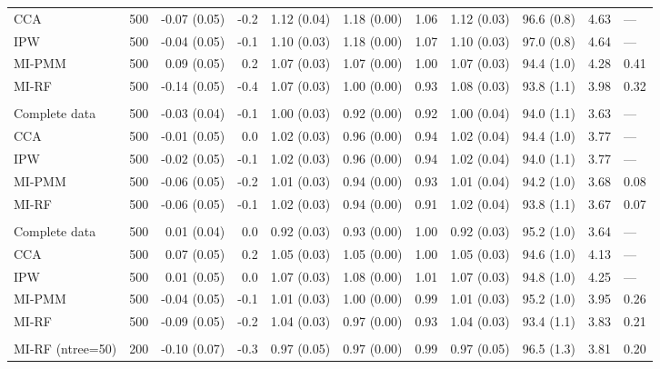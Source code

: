 \documentclass[11pt,a4paper]{article}
\begin{document}
\begin{landscape}
\begin{longtable}{l|rrrrrrrrrl}
CCA & 500 & -0.07 (0.05) & -0.2 & 1.12 (0.04) & 1.18 (0.00) & 1.06 & 1.12 (0.03) & 96.6 (0.8) & 4.63 & — \\ 
IPW & 500 & -0.04 (0.05) & -0.1 & 1.10 (0.03) & 1.18 (0.00) & 1.07 & 1.10 (0.03) & 97.0 (0.8) & 4.64 & — \\ 
MI-PMM & 500 & 0.09 (0.05) & 0.2 & 1.07 (0.03) & 1.07 (0.00) & 1.00 & 1.07 (0.03) & 94.4 (1.0) & 4.28 & 0.41 \\ 
MI-RF & 500 & -0.14 (0.05) & -0.4 & 1.07 (0.03) & 1.00 (0.00) & 0.93 & 1.08 (0.03) & 93.8 (1.1) & 3.98 & 0.32 \\ 
\midrule\addlinespace[2.5pt]
\multicolumn{11}{l}{Stunting — MAR 10\%} \\[2.5pt] 
\midrule\addlinespace[2.5pt]
Complete data & 500 & -0.03 (0.04) & -0.1 & 1.00 (0.03) & 0.92 (0.00) & 0.92 & 1.00 (0.04) & 94.0 (1.1) & 3.63 & — \\ 
CCA & 500 & -0.01 (0.05) & 0.0 & 1.02 (0.03) & 0.96 (0.00) & 0.94 & 1.02 (0.04) & 94.4 (1.0) & 3.77 & — \\ 
IPW & 500 & -0.02 (0.05) & -0.1 & 1.02 (0.03) & 0.96 (0.00) & 0.94 & 1.02 (0.04) & 94.0 (1.1) & 3.77 & — \\ 
MI-PMM & 500 & -0.06 (0.05) & -0.2 & 1.01 (0.03) & 0.94 (0.00) & 0.93 & 1.01 (0.04) & 94.2 (1.0) & 3.68 & 0.08 \\ 
MI-RF & 500 & -0.06 (0.05) & -0.1 & 1.02 (0.03) & 0.94 (0.00) & 0.91 & 1.02 (0.04) & 93.8 (1.1) & 3.67 & 0.07 \\ 
\midrule\addlinespace[2.5pt]
\multicolumn{11}{l}{Stunting — MAR 30\%} \\[2.5pt] 
\midrule\addlinespace[2.5pt]
Complete data & 500 & 0.01 (0.04) & 0.0 & 0.92 (0.03) & 0.93 (0.00) & 1.00 & 0.92 (0.03) & 95.2 (1.0) & 3.64 & — \\ 
CCA & 500 & 0.07 (0.05) & 0.2 & 1.05 (0.03) & 1.05 (0.00) & 1.00 & 1.05 (0.03) & 94.6 (1.0) & 4.13 & — \\ 
IPW & 500 & 0.01 (0.05) & 0.0 & 1.07 (0.03) & 1.08 (0.00) & 1.01 & 1.07 (0.03) & 94.8 (1.0) & 4.25 & — \\ 
MI-PMM & 500 & -0.04 (0.05) & -0.1 & 1.01 (0.03) & 1.00 (0.00) & 0.99 & 1.01 (0.03) & 95.2 (1.0) & 3.95 & 0.26 \\ 
MI-RF & 500 & -0.09 (0.05) & -0.2 & 1.04 (0.03) & 0.97 (0.00) & 0.93 & 1.04 (0.03) & 93.4 (1.1) & 3.83 & 0.21 \\ 
\midrule\addlinespace[2.5pt]
\multicolumn{11}{l}{Stunting — MAR 30\% (ntree=50)} \\[2.5pt] 
\midrule\addlinespace[2.5pt]
MI-RF (ntree=50) & 200 & -0.10 (0.07) & -0.3 & 0.97 (0.05) & 0.97 (0.00) & 0.99 & 0.97 (0.05) & 96.5 (1.3) & 3.81 & 0.20 \\ 

\end{longtable}
\end{landscape}
\end{document}
